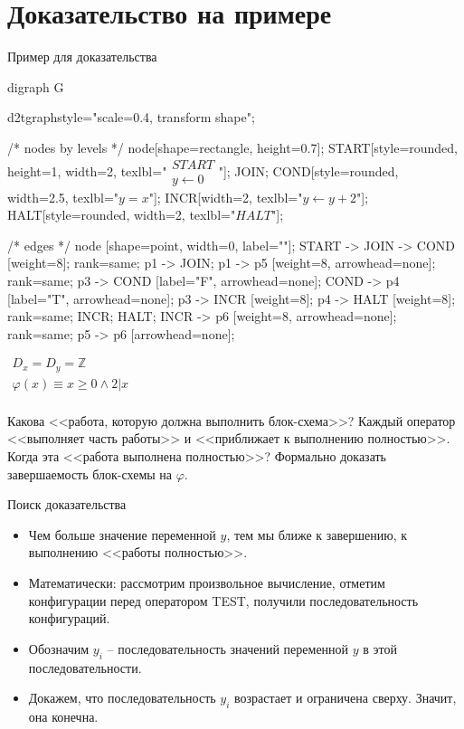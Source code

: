 \documentclass[hyperref={unicode=true}]{beamer}
\begin{document}
    \section{Доказательство на примере}

	\begin{frame}[fragile]{Пример для доказательства}
	\begin{multicols}{2}

	\huge
	\begin{dot2tex}[options=-traw]
	digraph G{
		d2tgraphstyle="scale=0.4, transform shape";

		/* nodes by levels */
		node[shape=rectangle, height=0.7];
		START[style=rounded, height=1, width=2, texlbl="$\begin{matrix}START\\ y \leftarrow 0\end{matrix}$"];
		JOIN;
        COND[style=rounded, width=2.5, texlbl="$y = x$"];
		INCR[width=2, texlbl="$y \leftarrow y + 2$"];
        HALT[style=rounded, width=2, texlbl="$HALT$"];

		/* edges */
		node [shape=point, width=0, label=""];
		START -> JOIN -> COND [weight=8];
		{ rank=same; p1 -> JOIN; }
		p1 -> p5 [weight=8, arrowhead=none];
		{ rank=same; p3 -> COND [label="F", arrowhead=none]; COND -> p4 [label="T", arrowhead=none]; }
		p3 -> INCR [weight=8];
		p4 -> HALT [weight=8];
		{ rank=same; INCR; HALT; }
		INCR -> p6 [weight=8, arrowhead=none];
		{ rank=same; p5 -> p6 [arrowhead=none]; }
        }
	\end{dot2tex}

	\normalsize

    $\begin{matrix}
    D_x = D_y = \mathbb{Z}\\
    \varphi(x) \equiv x \geq 0 \land 2 | x\\
    \end{matrix}$

    Какова <<работа, которую должна выполнить блок-схема>>?
    Каждый оператор <<выполняет часть работы>>
    и <<приближает к выполнению полностью>>.
    Когда эта <<работа выполнена полностью>>?
    Формально доказать завершаемость блок-схемы на $\varphi$.
	\end{multicols}
	\end{frame}

    \begin{frame}{Поиск доказательства}
    \begin{itemize}
    \item
    Чем больше значение переменной $y$, тем мы ближе к
    завершению, к выполнению <<работы полностью>>.
    \item
    Математически: рассмотрим произвольное вычисление,
    отметим конфигурации перед оператором TEST,
    получили последовательность конфигураций.
    \item
    Обозначим $y_i$ -- последовательность значений
    переменной $y$ в этой последовательности.
    \item
    Докажем, что последовательность $y_i$ возрастает
    и ограничена сверху. Значит, она конечна.
    \end{itemize}
    \end{frame}
\end{document}
